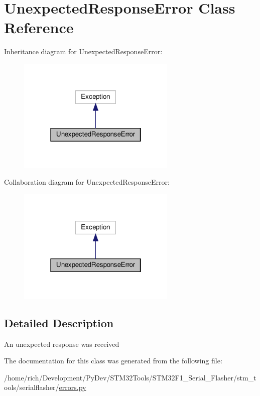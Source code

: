 \hypertarget{classstm__tools_1_1serialflasher_1_1errors_1_1UnexpectedResponseError}{}\section{Unexpected\+Response\+Error Class Reference}
\label{classstm__tools_1_1serialflasher_1_1errors_1_1UnexpectedResponseError}


Inheritance diagram for Unexpected\+Response\+Error\+:
\nopagebreak
\begin{figure}[H]
\begin{center}
\leavevmode
\includegraphics[width=214pt]{classstm__tools_1_1serialflasher_1_1errors_1_1UnexpectedResponseError__inherit__graph}
\end{center}
\end{figure}


Collaboration diagram for Unexpected\+Response\+Error\+:
\nopagebreak
\begin{figure}[H]
\begin{center}
\leavevmode
\includegraphics[width=214pt]{classstm__tools_1_1serialflasher_1_1errors_1_1UnexpectedResponseError__coll__graph}
\end{center}
\end{figure}


\subsection{Detailed Description}
\begin{DoxyVerb}An unexpected response was received\end{DoxyVerb}
 

The documentation for this class was generated from the following file\+:\begin{DoxyCompactItemize}
\item 
/home/rich/\+Development/\+Py\+Dev/\+S\+T\+M32\+Tools/\+S\+T\+M32\+F1\+\_\+\+Serial\+\_\+\+Flasher/stm\+\_\+tools/serialflasher/\hyperlink{errors_8py}{errors.\+py}\end{DoxyCompactItemize}
